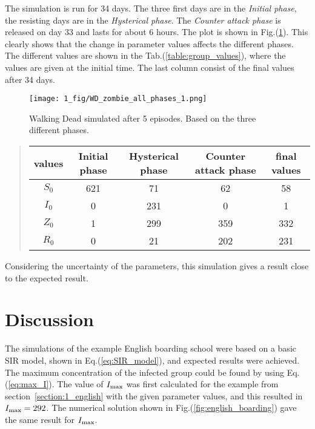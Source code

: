 \documentclass[%
twoside,                 %
final,                   %
chapterprefix=true,      %
open=right               %
10pt]{book}
\begin{document}
\noindent
The simulation is run for 34 days. The three first days are in the \emph{Initial phase}, the resisting days are in the \emph{Hysterical phase}. The \emph{Counter attack phase} is released on day 33 and lasts for about 6 hours. The plot is shown in Fig.(\ref{fig:all_phases}). This clearly shows that the change in parameter values affects the different phases. The different values are shown in the Tab.(\ref{table:group_values}), where the values are given at the initial time. The last column consist of the final values after 34 days.


\begin{figure}[ht]
  \centerline{\texttt{[image: 1\_fig/WD\_zombie\_all\_phases\_1.png]}}
  \caption{
  \label{fig:all_phases} Walking Dead simulated after 5 episodes. Based on the three different phases.
  }
\end{figure}




\label{table:group_values}

\begin{quote}
\begin{tabular}{ccccc}
\hline
\multicolumn{1}{c}{ values } & \multicolumn{1}{c}{ Initial phase } & \multicolumn{1}{c}{ Hysterical phase } & \multicolumn{1}{c}{ Counter attack phase } & \multicolumn{1}{c}{ final values } \\
\hline
$S_0$  & 621           & 71               & 62                   & 58           \\
$I_0$  & 0             & 231              & 0                    & 1            \\
$Z_0$  & 1             & 299              & 359                  & 332          \\
$R_0$  & 0             & 21               & 202                  & 231          \\
\hline
\end{tabular}
\end{quote}

\noindent
Considering the uncertainty of the parameters, this simulation gives a result close to the expected result. 


\vspace{3mm}




\vspace{3mm}



\section{Discussion}
The simulations of the example English boarding school were based on a basic SIR model, shown in Eq.(\ref{eq:SIR_model}), and expected results were achieved. The maximum concentration of the infected group could be found by using Eq.(\ref{eq:max_I}). The value of $I_{\textrm{max}}$ was first calculated for the example from section~\ref{section:1_english} with the given parameter values, and this resulted in $I_{\textrm{max}}=292$. The numerical solution shown in Fig.(\ref{fig:english_boarding}) gave the same result for $I_{\textrm{max}}$. 
\end{document}
